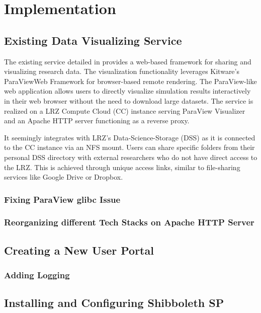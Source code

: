 \chapter{Implementation}\label{chapter:implementation}


\section{Existing Data Visualizing Service}

The existing service detailed in \cite{nowak2024pvw} provides a web-based
framework for sharing and visualizing research data. The visualization
functionality leverages Kitware's ParaViewWeb Framework for browser-based remote
rendering. The ParaView-like web application allows users to directly visualize
simulation results interactively in their web browser without the need to
download large datasets. The service is realized on a LRZ Compute Cloud (CC)
instance serving ParaView Visualizer and an Apache HTTP server functioning as a
reverse proxy.

It seemingly integrates with LRZ's Data-Science-Storage (DSS) as it is connected
to the CC instance via an NFS mount. Users can share specific folders from
their personal DSS directory with external researchers who do not have direct
access to the LRZ. This is achieved through unique access links, similar to
file-sharing services like Google Drive or Dropbox.

\subsection{Fixing ParaView glibc Issue}

\subsection{Reorganizing different Tech Stacks on Apache HTTP Server}

\section{Creating a New User Portal}

\subsection{Adding Logging}

\section{Installing and Configuring Shibboleth SP}\label{section:shibboleth}

